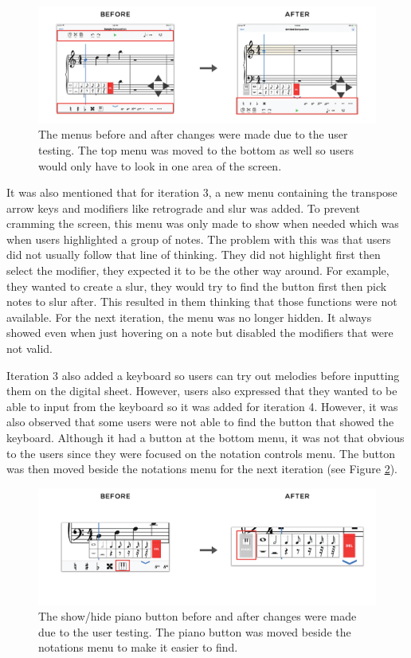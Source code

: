 			\begin{figure}[h]
				\centering
				\includegraphics[scale=0.28]{figures/before-after-menu}
			    \caption{The menus before and after changes were made due to the user testing. The top menu was moved to the bottom as well so users would only have to look in one area of the screen.}
			    \label{fig:before-after-menu}
			\end{figure}

			It was also mentioned that for iteration 3, a new menu containing the transpose arrow keys and modifiers like retrograde and slur was added. To prevent cramming the screen, this menu was only made to show when needed which was when users highlighted a group of notes. The problem with this was that users did not usually follow that line of thinking. They did not highlight first then select the modifier, they expected it to be the other way around. For example, they wanted to create a slur, they would try to find the button first then pick notes to slur after. This resulted in them thinking that those functions were not available. For the next iteration, the menu was no longer hidden. It always showed even when just hovering on a note but disabled the modifiers that were not valid. 

			Iteration 3 also added a keyboard so users can try out melodies before inputting them on the digital sheet. However, users also expressed that they wanted to be able to input from the keyboard so it was added for iteration 4. However, it was also observed that some users were not able to find the button that showed the keyboard. Although it had a button at the bottom menu, it was not that obvious to the users since they were focused on the notation controls menu. The button was then moved beside the notations menu for the next iteration (see Figure \ref{fig:before-after-pianobtn}). 

			\begin{figure}[h]
				\centering
				\includegraphics[scale=0.273]{figures/before-after-pianobtn.png}
			    \caption{The show/hide piano button before and after changes were made due to the user testing. The piano button was moved beside the notations menu to make it easier to find.}
			    \label{fig:before-after-pianobtn}
			\end{figure}

